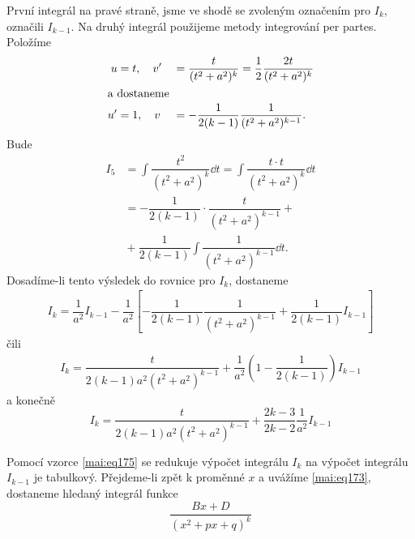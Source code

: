       První integrál na pravé straně, jsme ve shodě se zvoleným označením pro \(I_k\), označili
      \(I_{k-1}\). Na druhý integrál použijeme metody integrování per partes. Položíme 
      \begin{alignat*}{2}
        u  &= t, \quad v' &&=   \dfrac{t}{(t^2+a^2)^k} = \dfrac{1}{2}\dfrac{2t}{(t^2+a^2)^k}   \\
        \shortintertext{a dostaneme}
        u' &= 1, \quad v  &&= - \dfrac{1}{2(k-1)}\dfrac{1}{(t^2+a^2)^{k-1}}.
      \end{alignat*}
      Bude
      \begin{align}
        I_5 &=\int\dfrac{t^2}{(t^2+a^2)^k}\dd{t} 
             = \int\dfrac{t\cdot t}{(t^2+a^2)^k}\dd{t}                  \nonumber \\
            &= -\dfrac{1}{2(k-1)}\cdot\dfrac{t}{(t^2+a^2)^{k-1}} +      \nonumber \\
            &{}+\dfrac{1}{2(k-1)}\int\dfrac{1}{(t^2+a^2)^{k-1}}\dd{t}.  \label{mai:eq174}
      \end{align}
      Dosadíme-li tento výsledek do rovnice pro \(I_k\), dostaneme
      \begin{gather*}
        I_k = \dfrac{1}{a^2}I_{k-1} - \dfrac{1}{a^2}
              \left[
                -\dfrac{1}{2(k-1)}\dfrac{1}{(t^2+a^2)^{k-1}} + \dfrac{1}{2(k-1)}I_{k-1}                
              \right]
      \end{gather*}
      čili 
      \begin{gather*}
        I_k = \dfrac{t}{2(k-1)a^2(t^2+a^2)^{k-1}} + 
              \dfrac{1}{a^2}\left(1-\dfrac{1}{2(k-1)}\right)I_{k-1}                
      \end{gather*}
      a konečně
      \begin{equation}\label{mai:eq175}
        I_k = \dfrac{t}{2(k-1)a^2(t^2+a^2)^{k-1}} + \dfrac{2k-3}{2k-2}\dfrac{1}{a^2}I_{k-1}                
      \end{equation}

      Pomocí vzorce \ref{mai:eq175} se redukuje výpočet integrálu \(I_k\) na výpočet integrálu
      \(I_{k-1}\) je tabulkový. Přejdeme-li zpět k proměnné \(x\) a uvážíme \ref{mai:eq173},
      dostaneme hledaný integrál funkce
      \begin{equation*}
        \dfrac{Bx + D}{(x^2+px+q)^k}
      \end{equation*}

      
      

